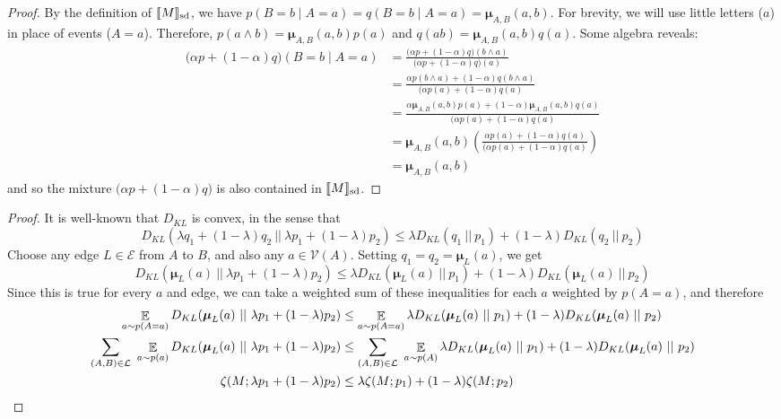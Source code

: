 \documentclass{article}
\newcommand\SD{_{\text{sd}}}
\newcommand{\bmu}{\boldsymbol{\mu}}
\newcommand{\Ed}{\mathcal E}
\numberwithin{equation}{section}
\begin{document}
\begin{notfocus}
\begin{proof}
		By the definition of $\bbr{M}\SD$, we have $p(B = b \mid A = a) = q(B = b \mid A = a) = \bmu_{A,B}(a,b)$.  
		For brevity, we will use little letters ($a$) in place of events ($A = a$).
		Therefore, $p(a\land b) = \bmu_{A,B}(a,b) p(a)$ and $q(ab) = \bmu_{A,B}(a,b) q(a)$. Some algebra reveals:
		\begin{align*}
			\Big( \alpha p + (1-\alpha) q \Big) (B = b \mid A = a) &= 
			\frac{\Big( \alpha p + (1-\alpha) q \Big) (b \land a)}{\Big( \alpha p + (1-\alpha) q \Big) (a)} \\
			&= \frac{ \alpha p(b \land a) + (1-\alpha) q(b \land a) }{\Big( \alpha p(a) + (1-\alpha) q (a)} \\
			&= \frac{ \alpha \bmu_{A,B}(a,b) p(a) + (1-\alpha) \bmu_{A,B}(a,b) q(a) }{\Big( \alpha p(a) + (1-\alpha) q (a)} \\
			&=\bmu_{A,B}(a,b) \left(\frac{ \alpha  p(a) + (1-\alpha) q(a) }{\Big( \alpha p(a) + (1-\alpha) q (a)}\right)\\
			&= \bmu_{A,B}(a,b)
		\end{align*}
		and so the mixture $\Big(\alpha p + (1-\alpha) q \Big)$ is also contained in $\bbr{M}\SD$.
	\end{proof}
	
	
	\thmzetaconvex*
	\begin{proof}
		It is well-known that $D_{KL}$ is convex, in the sense that 
		\[ D_{KL}(\lambda q_1 + (1-\lambda) q_2 \ ||\ \lambda p_1 + (1-\lambda) p_2) \leq \lambda D_{KL} (q_1\ ||\ p_1) + (1-\lambda) D_{KL}(q_2\ ||\ p_2) \]
		Choose any edge $L \in \Ed$ from $A$ to $B$, and also any $a \in \mathcal V(A)$. 
		Setting $q_1 = q_2 = \bmu_L(a)$, we get
		\[ D_{KL}(\bmu_L(a) \ ||\ \lambda p_1 + (1-\lambda) p_2) \leq \lambda D_{KL} (\bmu_L(a) \ ||\ p_1) + (1-\lambda) D_{KL}(\bmu_L(a)\ ||\ p_2) \]
		Since this is true for every $a$ and edge, we can take a weighted sum of these inequalities for each $a$ weighted by $p(A=a)$, and therefore
		\begin{align*}
			\E_{a\sim p(A=a)} D_{KL}(\bmu_L(a) \ ||\ \lambda p_1 + (1-\lambda) p_2) &\leq \E_{a\sim p(A=a)}\lambda D_{KL} (\bmu_L(a) \ ||\ p_1) + (1-\lambda) D_{KL}(\bmu_L(a)\ ||\ p_2) \\
			\sum_{(A, B) \in \cal L}~\E_{a\sim p(a)} D_{KL}(\bmu_L(a) \ ||\ \lambda p_1 + (1-\lambda) p_2) &\leq \sum_{(A, B) \in \cal L}~\E_{a\sim p(A)}\lambda D_{KL} (\bmu_L(a) \ ||\ p_1) + (1-\lambda) D_{KL}(\bmu_L(a)\ ||\ p_2) \\
			\zeta(M ; \lambda p_1 + (1-\lambda)p_2) &\leq \lambda \zeta(M;p_1) + (1-\lambda) \zeta(M;p_2)
		\end{align*}
	\end{proof}



\end{notfocus}
\end{document}
